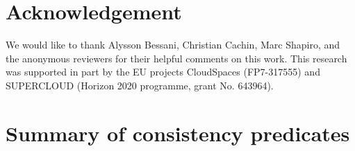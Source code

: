 \documentclass[letter, 11pt]{article}
\begin{document}
 
\section*{Acknowledgement}
We would like to thank Alysson Bessani, Christian Cachin, Marc Shapiro, and
the anonymous reviewers for their helpful comments on this work.
This research was supported in part by the EU projects
CloudSpaces (FP7-317555) and SUPERCLOUD (Horizon 2020 programme, grant No. 643964).





\clearpage
\appendix
\section{Summary of consistency predicates}
\label{sec:predicates}
\renewcommand{\arraystretch}{1.5}
\end{document}
